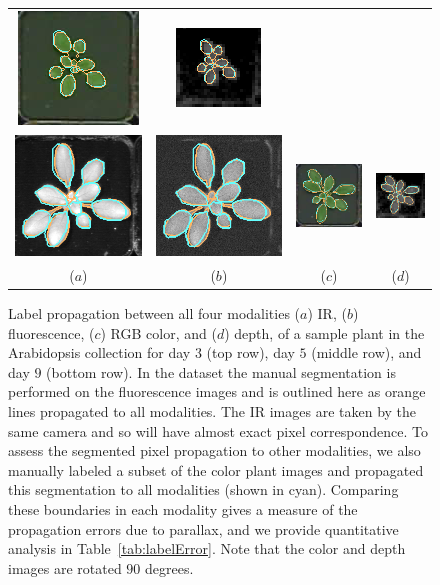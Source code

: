 \begin{figure}[t]
\begin{centering}
\begin{tabular}{cccc}
\includegraphics[width=.15\textwidth]{Figures/LabelAlignment/day_5_hour_23-seg_rgb.png}&
\includegraphics[width=.15\textwidth]{Figures/LabelAlignment/day_5_hour_23-seg_depth.png}\\
\includegraphics[width=.15\textwidth]{Figures/LabelAlignment/day_9_hour_20-seg_ir.png}&
\includegraphics[width=.15\textwidth]{Figures/LabelAlignment/day_9_hour_20-seg_fmp.png}&
\includegraphics[width=.15\textwidth]{Figures/LabelAlignment/day_9_hour_20-seg_rgb.png}&
\includegraphics[width=.15\textwidth]{Figures/LabelAlignment/day_9_hour_20-seg_depth.png}\\
($a$) & ($b$) & ($c$) & ($d$) \\
\end{tabular}
\caption{Label propagation between all four modalities ($a$) IR, ($b$) fluorescence, ($c$) RGB color, and ($d$) depth, of a sample plant in the Arabidopsis collection for day $3$ (top row), day $5$ (middle row), and day $9$ (bottom row).  
In the dataset the manual segmentation is performed on the fluorescence images and is outlined here as orange lines propagated to all modalities.  
The IR images are taken by the same camera and so will have almost exact pixel correspondence.  
To assess the segmented pixel propagation to other modalities, we also manually labeled a subset of the color plant images and propagated this segmentation to all modalities (shown in cyan).  
Comparing these boundaries in each modality gives a measure of the propagation errors due to parallax, and we provide quantitative analysis in Table~\ref{tab:labelError}.  
Note that the color and depth images are rotated $90$ degrees.}
\label{fig:LabelAlignment}
\end{centering}
\end{figure}


